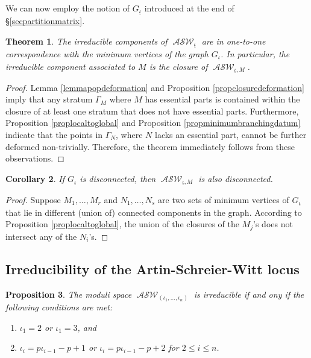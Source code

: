 \documentclass{compositio}
\newtheorem{theorem}{Theorem}[section]
\newtheorem{proposition}[theorem]{Proposition}
\newtheorem{corollary}[theorem]{Corollary}
\theoremstyle{remark}
\theoremstyle{remark}
\DeclareMathOperator{\ASW}{\mathcal{ASW}}
\begin{document}
We can now employ the notion of $G_{\underline{\iota}}$ introduced at the end of \S \ref{secpartitionmatrix}.

\begin{theorem}
\label{theoremirredcomponent}
The irreducible components of $\ASW_{\underline{\iota}}$ are in one-to-one correspondence with the minimum vertices of the graph $G_{\underline{\iota}}$. In particular, the irreducible component associated to $M$ is the closure of $\ASW_{\underline{\iota},M}$.
\end{theorem}

\begin{proof}
Lemma \ref{lemmapopdeformation} and Proposition \ref{propclosuredeformation} imply that any stratum $\Gamma_M$ where $M$ has essential parts is contained within the closure of at least one stratum that does not have essential parts. Furthermore, Proposition \ref{proplocaltoglobal} and Proposition \ref{propminimumbranchingdatum} indicate that the points in $\Gamma_N$, where $N$ lacks an essential part, cannot be further deformed non-trivially. Therefore, the theorem immediately follows from these observations.
\end{proof}

\begin{corollary}
If $G_{\underline{\iota}}$ is disconnected, then $\ASW_{\underline{\iota},M}$ is also disconnected.
\end{corollary}

\begin{proof}
Suppose ${M_1, \ldots, M_r}$ and ${N_1, \ldots, N_s}$ are two sets of minimum vertices of $G_{\underline{\iota}}$ that lie in different (union of) connected components in the graph. According to Proposition \ref{proplocaltoglobal}, the union of the closures of the $M_j$'s does not intersect any of the $N_i$'s. 
\end{proof}



\subsection{Irreducibility of the Artin-Schreier-Witt locus}

\begin{proposition}
The moduli space $\ASW_{(\iota_1, \ldots, \iota_n)}$ is irreducible if and ony if the following conditions are met:
\begin{enumerate}[label*=\arabic*.]
    \item $\iota_1=2$ or $\iota_1=3$, and
    \item $\iota_{i}=p\iota_{i-1}-p+1$ or $\iota_{i}=p\iota_{i-1}-p+2$ for $2 \le i \le n$.
\end{enumerate}
\end{proposition}
\end{document}
